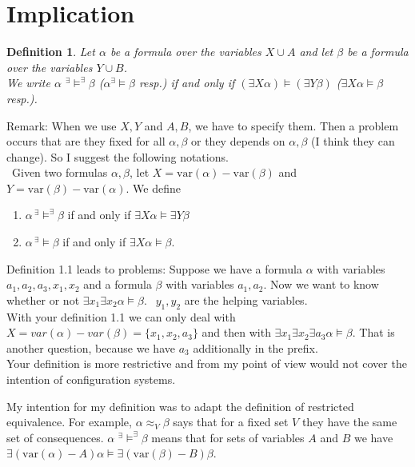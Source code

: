 \documentclass[12pt]{article}
\newcommand{\AM}{\mbox{$^\exists\!\!\models$}}
\newcommand{\AMB}{\mbox{$^\exists\!\!\models^\exists$}}
\newtheorem{definition}{Definition}[section]
\begin{document}
\section{Implication}
\begin{definition}
Let $\alpha$ be a formula over the variables $X \cup A$ and let $\beta$ be a formula over the variables $Y \cup B$.\\
We write $\alpha $ \AMB $\beta$ ($\alpha $\AM $\beta$ resp.) if and only if
$(\exists X \alpha) \models (\exists Y \beta)$ ($\exists X \alpha \models \beta$ resp.).
\end{definition}

\color{red}
\noindent Remark: When we use $X,Y$ and $A, B$, we have to specify them. Then a problem occurs that are they fixed for all $\alpha, \beta$ or they depends on $\alpha, \beta$ (I think they can change). So I suggest the following notations.\\

\
Given two formulas $\alpha,\beta$, let $X=\mbox{var}(\alpha)-\mbox{var}(\beta)$ and $Y=\mbox{var}(\beta)-\mbox{var}(\alpha)$. We define
\begin{enumerate}
\item $\alpha\, ^\exists\!\!\models^\exists \beta$ if and only if $\exists X\alpha\models \exists Y\beta$

\item $\alpha\, ^\exists\!\!\models \beta$ if and only if $\exists X \alpha\models \beta$.
\end{enumerate}
\color{blue}
Definition 1.1 leads to problems: Suppose we have a formula $\alpha$ with variables $a_1, a_2, a_3, x_1, x_2$ and a formula $\beta$ with variables $a_1, a_2$. Now we want to know whether or not $\exists x_1 \exists x_2 \alpha \models \beta$. $\ \ y_1,y_2$ are the helping variables.\\
With your definition 1.1 we can only deal with $X= var(\alpha) - var(\beta) = \{x_1, x_2, a_3\}$ and then
with
$\exists x_1 \exists  x_2 \exists a_3 \alpha \models \beta$. That is another question, because we have $a_3$ additionally in the prefix.\\
Your definition is more restrictive and from my point of view would not cover the intention of configuration systems.

My intention for my definition was to adapt the definition of restricted equivalence. For example, $\alpha \approx_{V}
\beta$ says that for a fixed set $V$ they have the same set of consequences. $\alpha$ \AMB $\beta$ means that for sets of
variables $A$ and $B$ we have $\exists (\mbox{var}(\alpha) - A) \alpha \models \exists (\mbox{var}(\beta) - B) \beta$.
\color{black}
\end{document}
